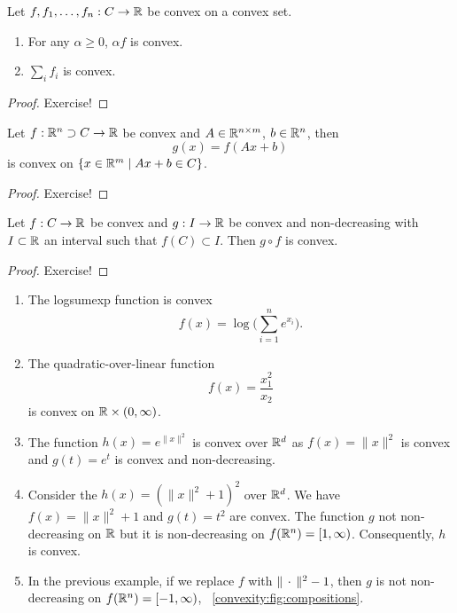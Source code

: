\begin{lemma}
    Let $f, f_1,\dots, f_n:C\rightarrow\mathbb{R}$ be convex on a convex set. 
    \begin{enumerate}
        \item For any $\alpha\geq 0$, $\alpha f$ is convex.
        \item $\sum_i f_i$ is convex.
    \end{enumerate}
\end{lemma}
\begin{proof}
    Exercise!
\end{proof}

\begin{lemma}
    Let $f:\mathbb{R}^n\supset C\rightarrow\mathbb{R}$ be convex and $A\in \mathbb{R}^{n\times m}$, $b\in \mathbb{R}^n$, then 
    \begin{equation}
        g(x) = f(Ax+b)
    \end{equation}
    is convex on $\{x\in \mathbb{R}^m\;|\; Ax+b\in C\}$.
\end{lemma}
\begin{proof}
    Exercise!
\end{proof}

\begin{lemma}
    Let $f:C\rightarrow\mathbb{R}$ be convex and $g:I\rightarrow \mathbb{R}$ be convex and non-decreasing with $I\subset\mathbb{R}$ an interval such that $f(C)\subset I$. Then $g\circ f$ is convex.
\end{lemma}
\begin{proof}
    Exercise!
\end{proof}

\begin{example}
    \begin{enumerate}
        \item The logsumexp function is convex
        \begin{equation}
            f(x) = \log\bigg(\sum_{i=1}^n e^{x_i}\bigg).
        \end{equation}
        \item The quadratic-over-linear function
        \begin{equation}
            f(x) = \frac{x_1^2}{x_2}
        \end{equation}
        is convex on $\mathbb{R}\times (0,\infty)$.
        \item The function $h(x) = e^{\|x\|^2}$ is convex over $\mathbb{R}^d$ as $f(x) = \|x\|^2$ is convex and $g(t)=e^t$ is convex and non-decreasing.
		\item Consider the $h(x) = (\|x\|^2+1)^2$ over $\mathbb{R}^d$. We have $f(x)=\|x\|^2+1$ and $g(t)=t^2$ are convex. The function \( g \) not non-decreasing on $\mathbb{R}$ but it is non-decreasing on \( f(\mathbb{R}^n) = [1, \infty) \). Consequently, \( h \) is convex.
        \item In the previous example, if we replace \( f \) with \( \|\,\cdot\, \|^2 - 1 \), then \( g \) is not non-decreasing on \( f(\mathbb{R}^n) = [-1, \infty) \), \cf~\cref{convexity:fig:compositions}.
    \end{enumerate}
\end{example}

